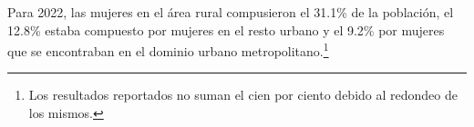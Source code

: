 Para 2022, las mujeres en el área rural compusieron el 31.1\% de la población, el 12.8\% estaba compuesto por mujeres en el resto urbano y el 9.2\% por mujeres que se encontraban en el dominio urbano metropolitano.\footnote{Los resultados reportados no suman el cien por ciento debido al redondeo de los mismos.}
